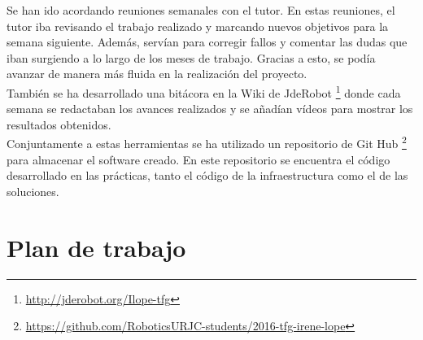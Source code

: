 Se han ido acordando reuniones semanales con el tutor. En estas reuniones, el tutor iba revisando el trabajo realizado y marcando nuevos objetivos para la semana siguiente. Además, servían para corregir fallos y comentar las dudas que iban surgiendo a lo largo de los meses de trabajo. Gracias a esto, se podía avanzar de manera más fluida en la realización del proyecto. \\

También se ha desarrollado una bitácora en la Wiki de JdeRobot \footnote{\url{http://jderobot.org/Ilope-tfg}} donde cada semana se redactaban los avances realizados y se añadían vídeos para mostrar los resultados obtenidos. \\

Conjuntamente a estas herramientas se ha utilizado un repositorio de Git Hub \footnote{\url{https://github.com/RoboticsURJC-students/2016-tfg-irene-lope}} para almacenar el software creado. En este repositorio se encuentra el código desarrollado en las prácticas, tanto el código de la infraestructura como el de las soluciones.

\section{Plan de trabajo}

